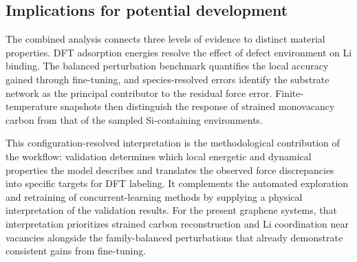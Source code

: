 \FloatBarrier
\subsection{Implications for potential development}

The combined analysis connects three levels of evidence to distinct material
properties. DFT adsorption energies resolve the effect of defect environment
on Li binding. The balanced perturbation benchmark quantifies the local
accuracy gained through fine-tuning, and species-resolved errors identify the
substrate network as the principal contributor to the residual force error.
Finite-temperature snapshots then distinguish the response of strained
monovacancy carbon from that of the sampled Si-containing environments.

This configuration-resolved interpretation is the methodological contribution
of the workflow: validation determines which local energetic and dynamical
properties the model describes and translates the observed force discrepancies
into specific targets for DFT labeling. It complements the automated
exploration and retraining of concurrent-learning methods by supplying a
physical interpretation of the validation results. For the present graphene
systems, that interpretation prioritizes strained carbon reconstruction and
Li coordination near vacancies alongside the family-balanced perturbations
that already demonstrate consistent gains from fine-tuning.
